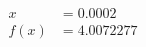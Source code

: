 \documentclass[preview]{standalone}
\begin{document}
\begin{align*}
x &= 0.0002\\f(x) &= 4.0072277
\end{align*}
\end{document}
